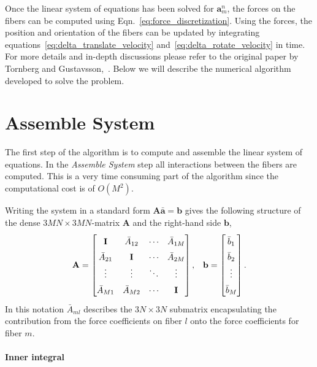Once the linear system of equations has been solved for $\mathbf{a}_m^n$, the forces on the fibers can be computed using Eqn.~\eqref{eq:force_discretization}. Using the forces, the position and orientation of the fibers can be updated by integrating equations~\eqref{eq:delta_translate_velocity} and~\eqref{eq:delta_rotate_velocity} in time. For more details and in-depth discussions please refer to the original paper by Tornberg and Gustavsson,~\cite{Tornberg2006}. Below we will describe the numerical algorithm developed to solve the problem.

\section{Assemble System}

The first step of the algorithm is to compute and assemble the linear system of equations. In the \emph{Assemble System} step all interactions between the fibers are computed. This is a very time consuming part of the algorithm since the computational cost is of $O(M^2)$.

Writing the system in a standard form $\mathbf{A}\mathbf{\bar{a}}=\mathbf{b}$ gives the following structure of the dense $3MN\times3MN$-matrix $\mathbf{A}$ and the right-hand side $\mathbf{b}$,
\begin{equation}
  \label{eq:matrix_structure}
  \renewcommand\arraystretch{1.5}
  \mathbf{A} =
  \begin{bmatrix}
    \mathbf{I} & \bar{A}_{12} & \cdots & \bar{A}_{1M} \\
    \bar{A}_{21} & \mathbf{I} & \cdots & \bar{A}_{2M} \\
    \vdots & \vdots & \ddots & \vdots \\
    \bar{A}_{M1} & \bar{A}_{M2} & \cdots & \mathbf{I}
  \end{bmatrix} \text{,} \quad \mathbf{b} =
  \begin{bmatrix}
    \bar{b}_{1} \\
    \bar{b}_{2} \\
    \vdots \\
    \bar{b}_{M} \\
  \end{bmatrix} \text{.}
\end{equation}
In this notation $\bar{A}_{ml}$ describes the $3N\times3N$ submatrix encapsulating the contribution from the force coefficients on fiber $l$ onto the force coefficients for fiber $m$.

\pagebreak
\paragraph{Inner integral}

